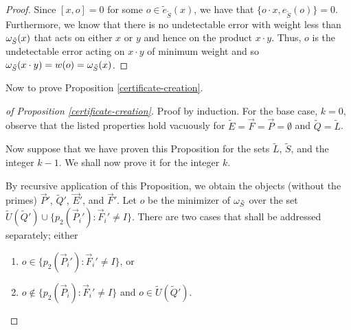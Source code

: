 \documentclass[twocolumn,showpacs,preprintnumbers,amsmath,amssymb,nofootinbib,pra,floatfix]{revtex4-1}
\newcommand{\lst}{\vec}
\newcommand{\set}{\tilde}
\begin{document}
\begin{proof}
Since $[x,o]=0$ for some $o\in\set e_{\set S}(x)$, we have that $\{o\cdot x,e_{\set S}(o)\}=0$.  Furthermore, we know that there is no undetectable error with weight less than $\om_{\set S}(x)$ that acts on either $x$ or $y$ and hence on the product $x\cdot y$.  Thus, $o$ is the undetectable error acting on $x\cdot y$ of minimum weight and so $\om_{\set S}(x\cdot y)=w(o)=\om_{\set S}(x)$.
\end{proof}
Now to prove Proposition \ref{certificate-creation}.

\begin{proof}[of Proposition \ref{certificate-creation}]

Proof by induction.  For the base case, $k=0$, observe that the listed properties hold vacuously for $\set E=\lst F=\lst P=\emptyset$ and $\set Q=\set L$.

Now suppose that we have proven this Proposition for the sets $\set L$, $\set S$, and the integer $k-1$.  We shall now prove it for the integer $k$.

By recursive application of this Proposition, we obtain the objects (without the primes) $\lst P'$, $\set Q'$, $\lst E'$, and $\lst F'$.  Let $o$ be the minimizer of $\om_{\set S}$ over the set $\set U(\set Q') \cup \{p_2(\lst P_i'):\lst F_i' \ne I\}$.  There are two cases that shall be addressed separately; either

\begin{enumerate}
\item $o\in\{p_2(\lst P_i'):\lst F_i' \ne I\}$, or
\item $o\notin\{p_2(\lst P_i):\lst F_i' \ne I\}$ and $o\in\set U(\set Q')$.
\end{enumerate}

\begin{description}


\end{description}
\end{proof}
\end{document}
